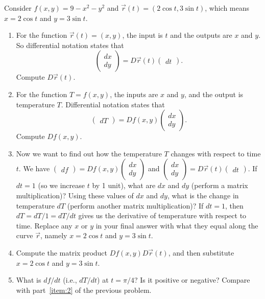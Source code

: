 \begin{problem}
 Consider $f(x,y)=9-x^2-y^2$ and $\vec r(t)=(2\cos t, 3\sin t)$, which means $x=2\cos t$ and $y=3\sin t$.
\begin{enumerate}
 \item{}%
For the function $\vec r(t)=(x,y)$, the input is $t$ and the outputs are $x$ and $y$.  So differential notation  states that 
$$\begin{pmatrix}dx\\dy\end{pmatrix}=D\vec r(t)\begin{pmatrix}dt\end{pmatrix}.$$
 Compute $D\vec r(t)$.
 \item For the function $T=f(x,y)$, the inputs are $x$ and $y$, and the output is temperature $T$. Differential notation  states that 
$$\begin{pmatrix}dT\end{pmatrix}=Df(x,y)\begin{pmatrix}dx\\dy\end{pmatrix}.$$
 Compute $Df(x,y)$.
 \item Now we want to find out how the temperature $T$ changes with respect to time $t$.  We have $\begin{pmatrix}df\end{pmatrix}=Df(x,y)\begin{pmatrix}dx\\dy\end{pmatrix}$ and $\begin{pmatrix}dx\\dy\end{pmatrix}=D\vec r(t)\begin{pmatrix}dt\end{pmatrix}.$ If $dt=1$ (so we increase $t$ by 1 unit), what are $dx$ and $dy$ (perform a matrix multiplication)? Using these values of $dx$ and $dy$, what is the change in temperature $dT$ (perform another matrix multiplication)? If $dt=1$, then $dT=dT/1=dT/dt$ gives us the derivative of temperature with respect to time. Replace any $x$ or $y$ in your final answer with what they equal along the curve $\vec r$, namely $x=2\cos t$ and $y=3\sin t$.
 \item Compute the matrix product $Df(x,y)D\vec r(t)$, and then substitute $x=2\cos t$ and $y=3\sin t$.
 \item What is $df/dt$ (i.e., $dT/dt$) at $t=\pi/4$? Is it positive or negative? Compare with part~\ref{item:2} of the previous problem.
\end{enumerate}
\end{problem}

